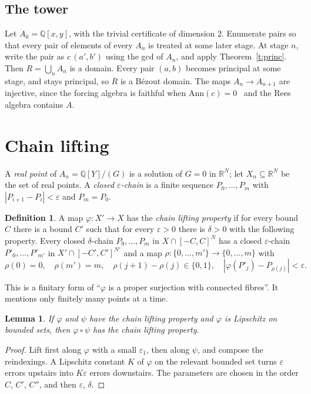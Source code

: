 \documentclass[11pt]{article}
\newcommand{\Q}{\mathbb{Q}}
\newcommand{\R}{\mathbb{R}}
\numberwithin{equation}{section}
\theoremstyle{plain}
\newtheorem{lemma}[theorem]{Lemma}
\theoremstyle{definition}
\newtheorem{definition}[theorem]{Definition}
\theoremstyle{remark}
\begin{document}
\subsection{The tower}

Let $A_0=\Q[x,y]$, with the trivial certificate of dimension $2$. Enumerate pairs so that every pair
of elements of every $A_n$ is treated at some later stage. At stage $n$, write the pair as
$c\,(a',b')$ using the gcd of $A_n$, and apply Theorem~\ref{t:princ}. Then $R=\bigcup_nA_n$ is a
domain. Every pair $(a,b)$ becomes principal at some stage, and stays principal, so $R$ is a
Bézout domain. The maps $A_n\to A_{n+1}$ are injective, since the forcing algebra is faithful when
$\mathrm{Ann}(c)=0$~\cite[II.2.14]{LQ} and the Rees algebra contains $A$.

\section{Chain lifting}\label{s:chains}

A \emph{real point} of $A_n=\Q[Y]/(G)$ is a solution of $G=0$ in $\R^N$; let $X_n\subseteq\R^N$ be the
set of real points. A \emph{closed $\varepsilon$-chain} is a finite sequence $P_0,\dots,P_m$ with
$|P_{i+1}-P_i|<\varepsilon$ and $P_m=P_0$.

\begin{definition}\label{d:chain}
A map $\varphi:X'\to X$ has the \emph{chain lifting property} if for every bound $C$ there is a
bound $C'$ such that for every $\varepsilon>0$ there is $\delta>0$ with the following property.
Every closed $\delta$-chain $P_0,\dots,P_m$ in $X\cap[-C,C]^N$ has a closed $\varepsilon$-chain
$P'_0,\dots,P'_{m'}$ in $X'\cap[-C',C']^{N'}$ and a map $\rho:\{0,\dots,m'\}\to\{0,\dots,m\}$ with
\[
\rho(0)=0,\quad\rho(m')=m,\quad\rho(j+1)-\rho(j)\in\{0,1\},\quad
|\varphi(P'_j)-P_{\rho(j)}|<\varepsilon .
\]
\end{definition}

This is a finitary form of ``$\varphi$ is a proper surjection with connected fibres''. It mentions
only finitely many points at a time.

\begin{lemma}\label{l:compose}
If $\varphi$ and $\psi$ have the chain lifting property and $\varphi$ is Lipschitz on bounded sets,
then $\varphi\circ\psi$ has the chain lifting property.
\end{lemma}

\begin{proof}
Lift first along $\varphi$ with a small $\varepsilon_1$, then along $\psi$, and compose the
reindexings. A Lipschitz constant $K$ of $\varphi$ on the relevant bounded set turns $\varepsilon$
errors upstairs into $K\varepsilon$ errors downstairs. The parameters are chosen in the order $C$,
$C'$, $C''$, and then $\varepsilon$, $\delta$.
\end{proof}
\end{document}
